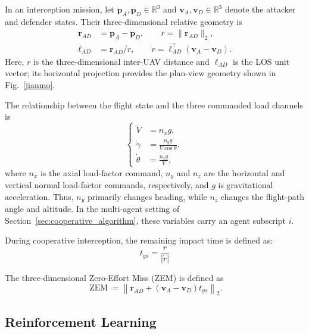 \documentclass[lettersize,journal]{IEEEtran}
\begin{document}
In an interception mission, let $\mathbf p_A,\mathbf p_D\in\mathbb R^3$ and
$\mathbf v_A,\mathbf v_D\in\mathbb R^3$ denote the attacker and defender states. Their
three-dimensional relative geometry is
\begin{equation}
\label{gongfang}
\begin{aligned}
\mathbf r_{AD}&=\mathbf p_A-\mathbf p_D,\qquad
r=\|\mathbf r_{AD}\|_2,\\
\boldsymbol\ell_{AD}&=\mathbf r_{AD}/r,\qquad
\dot r=\boldsymbol\ell_{AD}^{\top}(\mathbf v_A-\mathbf v_D).
\end{aligned}
\end{equation}
Here, $r$ is the three-dimensional inter-UAV distance and
$\boldsymbol\ell_{AD}$ is the LOS unit vector; its horizontal projection provides the
plan-view geometry shown in Fig.~\ref{jianmo}.

The relationship between the flight state and the three commanded load channels is
\begin{equation}
\label{guozai}
\left\{\begin{aligned}
\dot V&=n_xg,\\
\dot\gamma&=\frac{n_yg}{V\cos\theta},\\
\dot\theta&=\frac{n_zg}{V},
\end{aligned}\right.
\end{equation}
where $n_x$ is the axial load-factor command, $n_y$ and $n_z$ are the horizontal and vertical
normal load-factor commands, respectively, and $g$ is gravitational acceleration. Thus,
$n_y$ primarily changes heading, while $n_z$ changes the flight-path angle and altitude.
In the multi-agent setting of Section~\ref{sec:cooperative_algorithm}, these variables carry
an agent subscript $i$.

During cooperative interception, the remaining impact time is defined as:
\begin{equation}
\label{shijian}
t_{go}=\frac{r}{\left|\dot{r}\right|}
\end{equation}

The three-dimensional Zero-Effort Miss (ZEM) is defined as
\begin{equation}
\label{ZEM}
\operatorname{ZEM}=\left\|\mathbf r_{AD}
+(\mathbf v_A-\mathbf v_D)t_{go}\right\|_2.
\end{equation}

\subsection{Reinforcement Learning}
\end{document}

